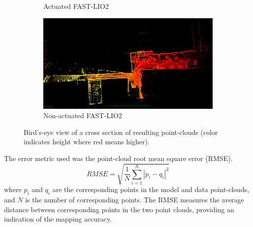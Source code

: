 \documentclass[a4paper, conference]{IEEEtran}
\begin{document}
\begin{figure}[t]
\begin{subfigure}{0.492\columnwidth}
        \caption{Actuated FAST-LIO2}
        \label{fig:act_fast_lio_top}\end{subfigure}
\hfill
\begin{subfigure}{0.492\columnwidth}
        \centering
        \includegraphics[width=\textwidth]{pics/eagle_view/non_lio_top.png}
        \caption{Non-actuated FAST-LIO2}
        \label{fig:non_act_fast_lio_top}
\end{subfigure}
\caption{Bird's-eye view of a cross section of resulting point-clouds (color indicates height where red means higher).}\vspace{-1mm}
\end{figure}

The error metric used was the point-cloud root mean square error (RMSE).
\begin{equation}
    RMSE = \sqrt{\frac{1}{N} \sum_{i=1}^{N} |p_i - q_i|^2}
\end{equation}
where \( p_i \) and \( q_i \) are the corresponding points in the model and data point-clouds, and \( N \) is the number of corresponding points. 
The RMSE measures the average distance between corresponding points in the two point clouds, providing an indication of the mapping accuracy.

\end{document}
